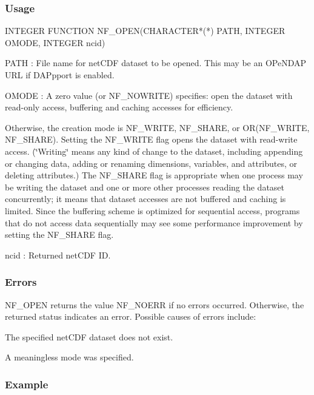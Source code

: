 \subsubsection*{Usage}


\begin{DoxyCode}
INTEGER FUNCTION NF\_OPEN(CHARACTER*(*) PATH, INTEGER OMODE, INTEGER ncid)
\end{DoxyCode}


{\ttfamily P\+A\+TH} \+: File name for net\+C\+DF dataset to be opened. This may be an O\+Pe\+N\+D\+AP U\+RL if D\+A\+Ppport is enabled.

{\ttfamily O\+M\+O\+DE} \+: A zero value (or N\+F\+\_\+\+N\+O\+W\+R\+I\+TE) specifies\+: open the dataset with read-\/only access, buffering and caching accesses for efficiency.

Otherwise, the creation mode is N\+F\+\_\+\+W\+R\+I\+TE, N\+F\+\_\+\+S\+H\+A\+RE, or O\+R(\+N\+F\+\_\+\+W\+R\+I\+T\+E, N\+F\+\_\+\+S\+H\+A\+R\+E). Setting the N\+F\+\_\+\+W\+R\+I\+TE flag opens the dataset with read-\/write access. (\char`\"{}\+Writing\char`\"{} means any kind of change to the dataset, including appending or changing data, adding or renaming dimensions, variables, and attributes, or deleting attributes.) The N\+F\+\_\+\+S\+H\+A\+RE flag is appropriate when one process may be writing the dataset and one or more other processes reading the dataset concurrently; it means that dataset accesses are not buffered and caching is limited. Since the buffering scheme is optimized for sequential access, programs that do not access data sequentially may see some performance improvement by setting the N\+F\+\_\+\+S\+H\+A\+RE flag.

{\ttfamily ncid} \+: Returned net\+C\+DF ID.

\subsubsection*{Errors}

N\+F\+\_\+\+O\+P\+EN returns the value N\+F\+\_\+\+N\+O\+E\+RR if no errors occurred. Otherwise, the returned status indicates an error. Possible causes of errors include\+:


\begin{DoxyItemize}
\item The specified net\+C\+DF dataset does not exist.
\item A meaningless mode was specified.
\end{DoxyItemize}

\subsubsection*{Example}

